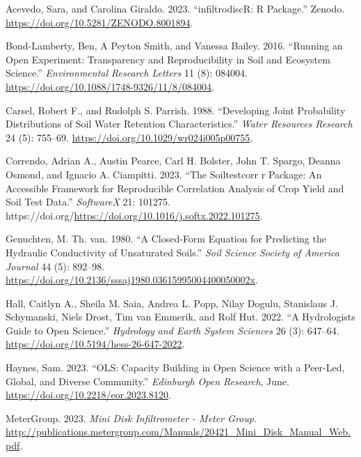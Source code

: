 \documentclass[
]{article}
\newlength{\cslhangindent}
\newlength{\cslentryspacingunit} %
\newenvironment{CSLReferences}[2] %
 {%
  \setlength{\parindent}{0pt}
  \ifodd #1
  \let\oldpar\par
  \def\par{\hangindent=\cslhangindent\oldpar}
  \fi
  \setlength{\parskip}{#2\cslentryspacingunit}
 }%
 {}
\begin{document}
\hypertarget{refs}{}
\begin{CSLReferences}{1}{0}
\leavevmode{}%
Acevedo, Sara, and Carolina Giraldo. 2023. {``infiltrodiscR: R
Package.''} Zenodo. \url{https://doi.org/10.5281/ZENODO.8001894}.

\leavevmode{}%
Bond-Lamberty, Ben, A Peyton Smith, and Vanessa Bailey. 2016. {``Running
an Open Experiment: Transparency and Reproducibility in Soil and
Ecosystem Science.''} \emph{Environmental Research Letters} 11 (8):
084004. \url{https://doi.org/10.1088/1748-9326/11/8/084004}.

\leavevmode{}%
Carsel, Robert F., and Rudolph S. Parrish. 1988. {``Developing Joint
Probability Distributions of Soil Water Retention Characteristics.''}
\emph{Water Resources Research} 24 (5): 755--69.
\url{https://doi.org/10.1029/wr024i005p00755}.

\leavevmode{}%
Correndo, Adrian A., Austin Pearce, Carl H. Bolster, John T. Spargo,
Deanna Osmond, and Ignacio A. Ciampitti. 2023. {``The Soiltestcorr r
Package: An Accessible Framework for Reproducible Correlation Analysis
of Crop Yield and Soil Test Data.''} \emph{SoftwareX} 21: 101275.
https://doi.org/\url{https://doi.org/10.1016/j.softx.2022.101275}.

\leavevmode{}%
Genuchten, M. Th. van. 1980. {``A Closed-Form Equation for Predicting
the Hydraulic Conductivity of Unsaturated Soils.''} \emph{Soil Science
Society of America Journal} 44 (5): 892--98.
\url{https://doi.org/10.2136/sssaj1980.03615995004400050002x}.

\leavevmode{}%
Hall, Caitlyn A., Sheila M. Saia, Andrea L. Popp, Nilay Dogulu,
Stanislaus J. Schymanski, Niels Drost, Tim van Emmerik, and Rolf Hut.
2022. {``A Hydrologist{\textquotesingle}s Guide to Open Science.''}
\emph{Hydrology and Earth System Sciences} 26 (3): 647--64.
\url{https://doi.org/10.5194/hess-26-647-2022}.

\leavevmode{}%
Haynes, Sam. 2023. {``{OLS}: Capacity Building in Open Science with a
Peer-Led, Global, and Diverse Community.''} \emph{Edinburgh Open
Research}, June. \url{https://doi.org/10.2218/eor.2023.8120}.

\leavevmode{}%
MeterGroup. 2023. \emph{Mini Disk Infiltrometer - Meter Group}.
\url{http://publications.metergroup.com/Manuals/20421_Mini_Disk_Manual_Web.pdf}.


\end{CSLReferences}
\end{document}
